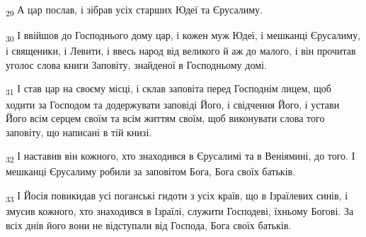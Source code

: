 \begin{tcolorbox}
\textsubscript{29} А цар послав, і зібрав усіх старших Юдеї та Єрусалиму.
\end{tcolorbox}
\begin{tcolorbox}
\textsubscript{30} І ввійшов до Господнього дому цар, і кожен муж Юдеї, і мешканці Єрусалиму, і священики, і Левити, і ввесь народ від великого й аж до малого, і він прочитав уголос слова книги Заповіту, знайденої в Господньому домі.
\end{tcolorbox}
\begin{tcolorbox}
\textsubscript{31} І став цар на своєму місці, і склав заповіта перед Господнім лицем, щоб ходити за Господом та додержувати заповіді Його, і свідчення Його, і устави Його всім серцем своїм та всім життям своїм, щоб виконувати слова того заповіту, що написані в тій книзі.
\end{tcolorbox}
\begin{tcolorbox}
\textsubscript{32} І наставив він кожного, хто знаходився в Єрусалимі та в Веніямині, до того. І мешканці Єрусалиму робили за заповітом Бога, Бога своїх батьків.
\end{tcolorbox}
\begin{tcolorbox}
\textsubscript{33} І Йосія повикидав усі поганські гидоти з усіх країв, що в Ізраїлевих синів, і змусив кожного, хто знаходився в Ізраїлі, служити Господеві, їхньому Богові. За всіх днів його вони не відступали від Господа, Бога своїх батьків.
\end{tcolorbox}
